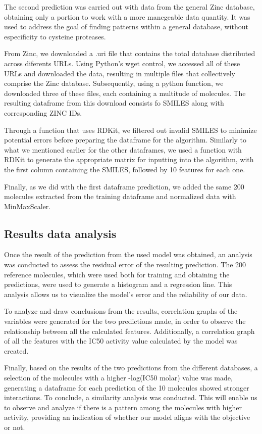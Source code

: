 \documentclass[final,times,twocolumn,article]{elsarticle}
\begin{document}
The second prediction was carried out with data from the general Zinc database, obtaining only a portion to work with a more manegeable data quantity. It was used to address the goal of finding patterns within a general database, without especificity to cysteine proteases. 

From Zinc, we downloaded a .uri file that contains the total database distributed across diferents URLs. Using Python's wget control, we accessed all of these URLs and downloaded the data, resulting in multiple files that collectively comprise the Zinc database. Subsequently, using a python function, we downloaded three of these files, each containing a multitude of molecules. The resulting dataframe from this download consists fo SMILES along with corresponding ZINC IDs. 

Through a function that uses RDKit, we filtered out invalid SMILES to minimize potential errors before preparing the dataframe for the algorithm. Similarly to what we mentioned earlier for the other dataframes, we used a function with RDKit to generate the appropriate matrix for inputting into the algorithm, with the first column containing the SMILES, followed by 10 features for each one. 

Finally, as we did with the first dataframe prediction, we added the same 200 molecules extracted from the training dataframe and normalized data with MinMaxScaler. 

\subsection{Results data analysis}

Once the result of the prediction from the used model was obtained, an analysis was conducted to assess the residual error of the resulting prediction. The 200 reference molecules, which were used both for training and obtaining the predictions, were used to generate a histogram and a regression line. This analysis allows us to visualize the model's error and the reliability of our data. 

To analyze and draw conclusions from the results, correlation graphs of the variables were generated for the two predictions made, in order to observe the relationship between all the calculated features. Additionally, a correlation graph of all the features with the IC50 activity value calculated by the model was created. 

Finally, based on the results of the two predictions from the different databases, a selection of the molecules with a higher -log(IC50 molar) value was made, generating a dataframe for each prediction of the 10 molecules showed stronger interactions. To conclude, a similarity analysis was conducted. This will enable us to observe and analyze if there is a pattern among the molecules with higher activity, providing an indication of whether our model aligns with the objective or not. 
\end{document}
